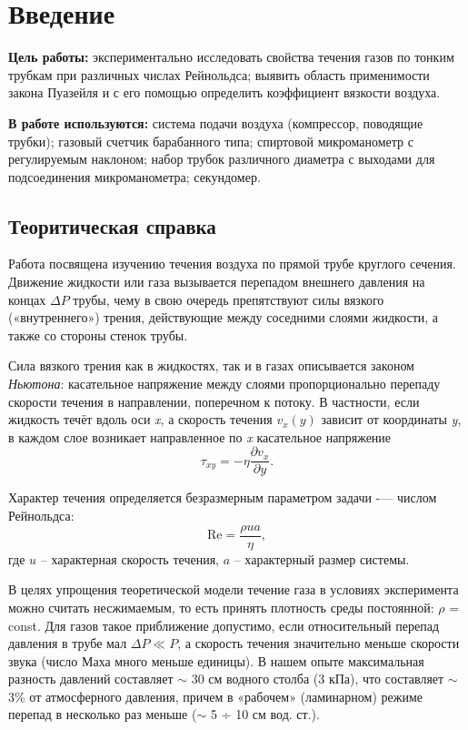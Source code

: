 \section{Введение}

\textbf{Цель работы:}
экспериментально исследовать свойства течения газов по тонким трубкам при различных числах Рейнольдса; выявить область применимости закона
Пуазейля и с его помощью определить коэффициент вязкости воздуха.

\textbf{В работе используются:}
система подачи воздуха (компрессор, поводящие трубки); газовый счетчик барабанного типа; спиртовой микроманометр с регулируемым
наклоном; набор трубок различного диаметра с выходами для подсоединения
микроманометра; секундомер.
\subsection{Теоритическая справка}
Работа посвящена изучению течения воздуха по прямой трубе круглого
сечения. Движение жидкости или газа вызывается перепадом внешнего
давления на концах $\Delta P$ трубы, чему в свою очередь препятствуют силы вязкого
(«внутреннего») трения, действующие между соседними слоями жидкости, а
также со стороны стенок трубы.

Сила вязкого трения как в жидкостях, так и в газах описывается законом
\textit{Ньютона}: касательное напряжение между слоями пропорционально перепаду
скорости течения в направлении, поперечном к потоку. В частности, если
жидкость течёт вдоль оси \textit{x}, а скорость течения $v_x(y)$ зависит от координаты \textit{y}, в
каждом слое возникает направленное по \textit{x} касательное напряжение
\begin{equation}
    \tau_{xy} = -\eta \frac{\partial v_x}{\partial y}.
\end{equation}

Характер течения определяется безразмерным параметром задачи -— числом Рейнольдса:
\begin{equation}
    \text{Re} = \frac{\rho ua}{\eta},
\end{equation}
где $u$ -- характерная скорость течения, $a$ -- характерный размер системы.

В целях упрощения теоретической модели течение газа в условиях
эксперимента можно считать несжимаемым, то есть принять плотность среды
постоянной: $\rho$ = const. Для газов такое приближение допустимо, если
относительный перепад давления в трубе мал $\Delta P\ll P $, а скорость течения
значительно меньше скорости звука (число Маха много меньше единицы). В нашем
опыте максимальная разность давлений составляет $\sim$ 30 см водного столба
(3 кПа), что составляет $\sim$ 3\% от атмосферного давления, причем в «рабочем»
(ламинарном) режиме перепад в несколько раз меньше ($\sim$ 5 ÷ 10 см вод. ст.).

